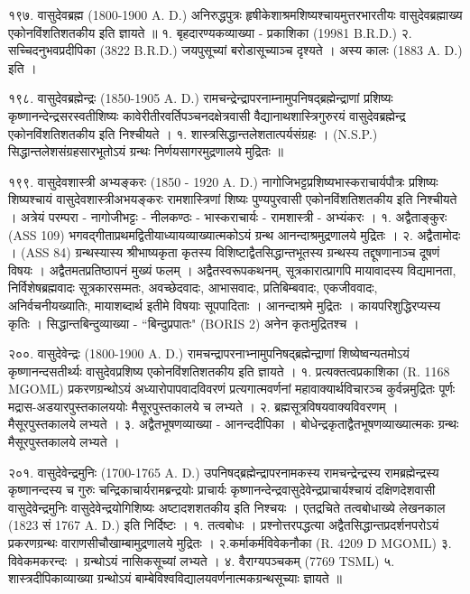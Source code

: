 १९७. वासुदेवब्रह्म (1800-1900 A. D.)
अनिरुद्धपुत्रः हृषीकेशाश्रमशिष्यश्चायमुत्तरभारतीयः वासुदेवब्रह्माख्य एकोनविंशतिशतकीय इति ज्ञायते ॥
१. बृहदारण्यकव्याख्या - प्रकाशिका (19981 B.R.D.)
२. सच्चिदनुभवप्रदीपिका (3822 B.R.D.) जयपुसूच्यां बरोडासूच्याञ्च दृश्यते । अस्य कालः (1883 A. D.) इति ।

१९८. वासुदेवब्रह्मेन्द्रः (1850-1905 A. D.)
रामचन्द्रेन्द्रापरनाम्नामुपनिषद्ब्रह्मेन्द्राणां प्रशिष्यः कृष्णानन्देन्द्रसरस्वतीशिष्यः कावेरीतीरवर्तिपञ्चनदक्षेत्रवासी वैद्यानाथशास्त्रिगुरुरयं वासुदेवब्रह्मेन्द्र एकोनविंशतिशतकीय इति निश्चीयते ।
१. शास्त्रसिद्धान्तलेशतात्पर्यसंग्रहः । (N.S.P.) सिद्धान्तलेशसंग्रहसारभूतोऽयं ग्रन्थः निर्णयसागरमुद्रणालये मुद्रितः ॥

१९९. वासुदेवशास्त्री अभ्यङ्करः (1850 - 1920 A. D.)
नागोजिभट्टप्रशिष्यभास्कराचार्यपौत्रः प्रशिष्यः शिष्यश्चायं वासुदेवशास्त्रीअभयङ्करः रामशास्त्रिणां शिष्यः पुण्यपुरवासी एकोनविंशतिशतकीय इति निश्चीयते । अत्रेयं परम्परा - नागोजीभट्टः - नीलकण्ठः - भास्कराचार्यः - रामशास्त्री - अभ्यंकरः ।
१. अद्वैताङ्कुरः (ASS 109) भगवद्गीताप्रथमद्वितीयाध्यायव्याख्यात्मकोऽयं ग्रन्थ आनन्दाश्रमुद्रणालये मुद्रितः ।
२. अद्वैतामोदः । (ASS 84)
ग्रन्थस्यास्य श्रीभाष्यकृता कृतस्य विशिष्टाद्वैतसिद्धान्तभूतस्य ग्रन्थस्य तद्दूषणानाञ्च दूषणं विषयः । अद्वैतमतप्रतिष्ठापनं मुख्यं फलम् । अद्वैतस्वरूपकथनम्, सूत्रकारात्प्रागपि मायावादस्य विद्यमानता, निर्विशेषब्रह्मवादः सूत्रकारसम्मतः, अवच्छेदवादः, आभासवादः, प्रतिबिम्बवादः, एकजीववादः, अनिर्वचनीयख्यातिः, मायाशब्दार्थ इतीमे विषयाः सूपपादिताः । आनन्दाश्रमे मुद्रितः । कायपरिशुद्धिरप्यस्य कृतिः । सिद्धान्तबिन्दुव्याख्या - ``बिन्दुप्रपातः" (BORIS 2) अनेन कृतःमुद्रितश्च ।

२००. वासुदेवेन्द्रः (1800-1900 A. D.)
रामचन्द्रापरनाभ्नामुपनिषद्ब्रह्मेन्द्राणां शिष्येष्वन्यतमोऽयं कृष्णानन्दसतीर्थ्यः वासुदेवप्रशिष्य एकोनविंशतिशतकीय इति ज्ञायते ।
१. प्रत्यक्तत्वप्रकाशिका (R. 1168 MGOML) प्रकरणग्रन्थोऽयं अध्यारोपापवादविवरणं प्रत्यगात्मवर्णनां महावाक्यार्थविचारञ्च कुर्वन्नमुद्रितः पूर्णः मद्रास-अडयारपुस्तकालययोः मैसूरपुस्तकालये च लभ्यते ।
२. ब्रह्मसूत्रविषयवाक्यविवरणम् । मैसूरपुस्तकालये लभ्यते ।
३. अद्वैतभूषणव्याख्या - आनन्ददीपिका । बोधेन्द्रकृताद्वैतभूषणव्याख्यात्मकः ग्रन्थः मैसूरपुस्तकालये लभ्यते ।

२०१. वासुदेवेन्द्रमुनिः (1700-1765 A. D.)
उपनिषद्ब्रह्मेन्द्रापरनामकस्य रामचन्द्रेन्द्रस्य रामब्रह्मेन्द्रस्य कृष्णानन्दस्य च गुरुः चन्द्रिकाचार्यरामब्रन्द्रयोः प्राचार्यः कृष्णानन्देन्द्रवासुदेवेन्द्रप्राचार्यश्चायं दक्षिणदेशवासी वासुदेवेन्द्रमुनिः वासुदेवेन्द्रयोगिशिष्यः अष्टादशशतकीय इति निश्चयः । एतद्रचिते तत्वबोधाख्ये लेखनकाल (1823 सं 1767 A. D.) इति निर्दिष्टः ।
१. तत्वबोधः । प्रश्नोत्तरपद्धत्या अद्वैतसिद्धान्तप्रदर्शनपरोऽयं प्रकरणग्रन्थः वाराणसीचौखाम्बामुद्रणालये मुद्रितः ।
२.कर्माकर्मविवेकनौका (R. 4209 D MGOML)
३. विवेकमकरन्दः । ग्रन्थोऽयं नासिकसूच्यां लभ्यते ।
४. वैराग्यपञ्चकम् (7769 TSML)
५. शास्त्रदीपिकाव्याख्या ग्रन्थोऽयं बाम्बेविश्वविद्यालयवर्णनात्मकग्रन्थसूच्याः ज्ञायते ॥

